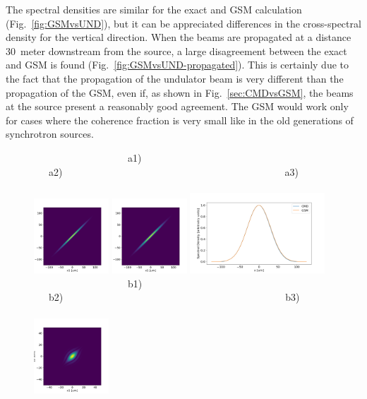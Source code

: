 \documentclass{iopconfser}
\begin{document}
The spectral densities are similar for the exact and GSM calculation (Fig.~\ref{fig:GSMvsUND}), but it can be appreciated differences in the cross-spectral density for the vertical direction.
When the beams are propagated at a distance \SI{30}{meter} downstream from the source, a large disagreement between the exact and GSM is found (Fig.~\ref{fig:GSMvsUND-propagated}). This is certainly due to the fact that the propagation of the undulator beam is very different than the propagation of the GSM, even if, as shown in Fig.~\ref{sec:CMDvsGSM}, the beams at the source present a reasonably good agreement. The GSM would work only for cases where the coherence fraction is very small like in the old generations of synchrotron sources.

\begin{figure}[H]
    \centering
~~~~~~~~~~~~~~~~~~~a1)~~~~~~~~~~~~~~~~~~~~~~~~~~~~~~~~~~~~~~~~~a2)~~~~~~~~~~~~~~~~~~~~~~~~~~~~~~~~~~~~~~~~~~~~~a3)~~~~~~~~~~~~~~~~~~~~~~~~~~~~~~~~~~~~~~~~~\\
    \includegraphics[width=0.25\textwidth]{figures/CMD_H.png}
    \includegraphics[width=0.25\textwidth]{figures/GSM_H.png}
    \includegraphics[width=0.45\textwidth]{figures/SD_H.png}\\
~~~~~~~~~~~~~~~~~~~b1)~~~~~~~~~~~~~~~~~~~~~~~~~~~~~~~~~~~~~~~~~b2)~~~~~~~~~~~~~~~~~~~~~~~~~~~~~~~~~~~~~~~~~~~~~b3)~~~~~~~~~~~~~~~~~~~~~~~~~~~~~~~~~~~~~~~~~\\
    \includegraphics[width=0.25\textwidth]{figures/CMD_V.png}

\end{figure}
\end{document}
